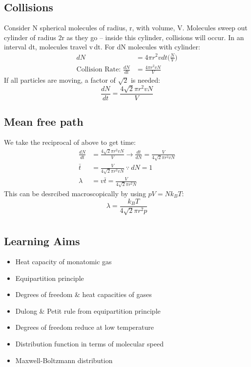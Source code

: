 \documentclass[a4paper, 11pt, normalem]{report}
\begin{document}
\section{Collisions}
Consider N spherical molecules of radius, r, with volume, V.
Molecules sweep out cylinder of radius 2r as they go -- inside this cylinder, collisions will occur.
In an interval dt, molecules travel v{\,}dt.
For dN molecules with cylinder:
\begin{align}
    dN &= 4{\pi}r^{2}vdt\Big(\frac{N}{V}\Big) \\
    \text{Collision Rate: } \frac{dN}{dt} &= \frac{4{\pi}r^{2}vN}{V}
\end{align}
If all particles are moving, a factor of $\sqrt{2}$ is needed:
\begin{equation}
	\frac{dN}{dt} = \frac{4\sqrt{2}{\pi}r^{2}vN}{V}
\end{equation}

\section{Mean free path}
We take the reciprocal of above to get time:
\begin{align}
    \frac{dN}{dt} &= \frac{4\sqrt{2}{\pi}r^{2}vN}{V} \rightarrow \frac{dt}{dN} = \frac{V}{4\sqrt{2}{\pi}r^{2}vN} \\
    \bar{t} &= \frac{V}{4\sqrt{2}{\pi}r^{2}vN} ~\because~ dN = 1 \\
    \lambda &= v\bar{t} = \frac{V}{4\sqrt{2}{\pi}r^{2}N}
\end{align}
This can be desrcibed macroscopically by using $pV = Nk_{B}T$:
\begin{equation}
	\lambda = \frac{k_{B}T}{4\sqrt{2}{\pi}r^{2}p}
\end{equation}

\chapter{}
\section{Learning Aims}
\begin{itemize}
	\item Heat capacity of monatomic gas
	\item Equipartition principle
	\item Degrees of freedom \& heat capacities of gases
	\item Dulong \& Petit rule from equipartition principle
	\item Degrees of freedom reduce at low temperature
	\item Distribution function in terms of molecular speed
	\item Maxwell-Boltzmann distribution
\end{itemize}
\end{document}
